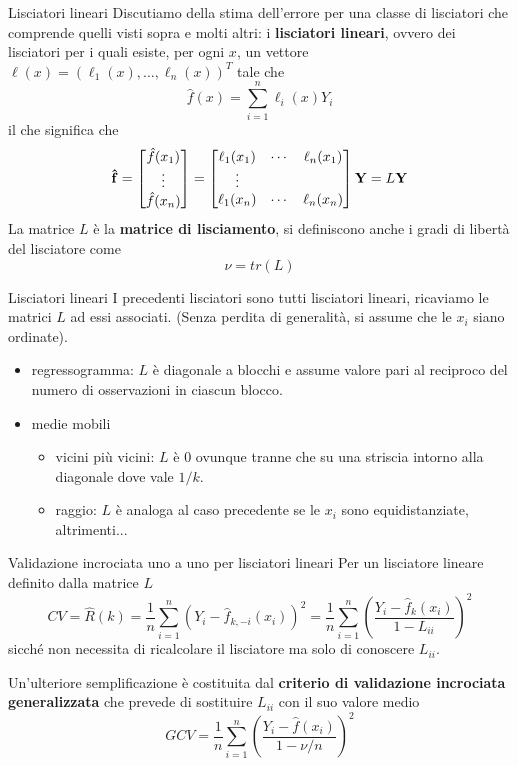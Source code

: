 \documentclass{beamer}
\newcommand{\spazio}{\noindent\makebox[\linewidth]{\resizebox{0.1\linewidth}{1pt}{{$\bullet$}}}}
\begin{document}
\begin{frame}{Lisciatori lineari}
Discutiamo della stima dell'errore per una classe di lisciatori che comprende quelli visti sopra e molti altri: i {\bf lisciatori lineari}, ovvero dei lisciatori per i quali esiste, per ogni $x$, un vettore $\ell(x)=(\ell_1(x),\ldots,\ell_n(x))^T$ tale che
\[ \hat{f}(x) = \sum_{i=1}^n \ell_i(x) Y_i  \]
il che significa che
\[
{\bf\hat{f}} =
\begin{bmatrix}
\hat{f}(x_1) \\ \vdots \\ \hat{f}(x_n)
\end{bmatrix}
=
\begin{bmatrix}
\ell_1(x_1) & \cdots & \ell_n(x_1) \\ \vdots \\ \ell_1(x_n) & \cdots & \ell_n(x_n) 
\end{bmatrix}
{\bf Y} 
= L{\bf Y}
\]
La matrice $L$ \`e la {\bf matrice di lisciamento}, si definiscono anche i gradi di libert\`a del lisciatore come
\[ \nu = tr(L) \]
\end{frame}

\begin{frame}{Lisciatori lineari}
I precedenti lisciatori sono tutti lisciatori lineari, ricaviamo le matrici $L$ ad essi associati. 
(Senza perdita di generalit\`a, si assume che le $x_i$ siano ordinate).
\begin{itemize}
\item regressogramma:  $L$ \`e diagonale a blocchi e assume valore pari al reciproco del numero di osservazioni in ciascun blocco.
\item medie mobili 
\begin{itemize}
\item vicini pi\`u vicini: $L$ \`e 0 ovunque tranne che su una striscia intorno alla diagonale dove vale $1/k$.
\item raggio: $L$ \`e analoga al caso precedente se le $x_i$ sono equidistanziate, altrimenti...
\end{itemize}
\end{itemize}
\end{frame}



\begin{frame}{Validazione incrociata uno  a uno per lisciatori lineari}
Per un lisciatore lineare definito dalla matrice $L$ 
\[
CV = \hat{R}(k) =\frac{1}{n} \sum_{i=1}^n (Y_i - \hat{f}_{k,-i}(x_i))^2
= \frac{1}{n} \sum_{i=1}^n\left(\frac{Y_i-\hat{f}_k(x_i)}{1-L_{ii}}\right)^2
\]
sicch\'e non necessita di ricalcolare il lisciatore ma solo di conoscere  $L_{ii}$.

\spazio

Un'ulteriore semplificazione \`e costituita dal {\bf criterio di validazione incrociata generalizzata} che prevede di sostituire $L_{ii}$ con il suo valore medio
\[ 
GCV = \frac{1}{n} \sum_{i=1}^n\left(\frac{Y_i-\hat{f}(x_i)}{1-\nu/n}\right)^2
\]
\end{frame}
\end{document}
